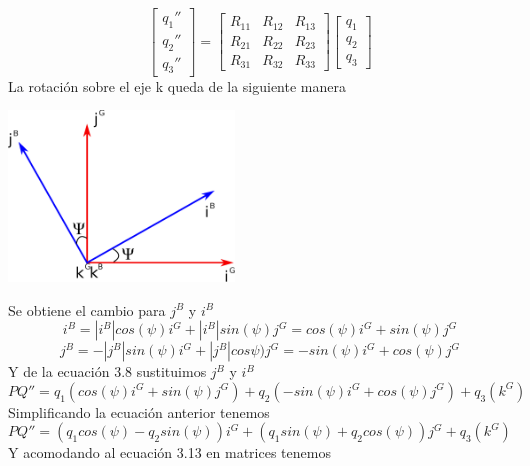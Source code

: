 \begin{equation}
	\begin{bmatrix}
		q_1'' \\
		q_2'' \\
		q_3''
	\end{bmatrix}
	=
	\begin{bmatrix}
		R_{11} & R_{12} & R_{13} \\
		R_{21} & R_{22} & R_{23} \\
		R_{31} & R_{32} & R_{33}
	\end{bmatrix}
	\begin{bmatrix}
		q_1 \\
		q_2 \\
		q_3
	\end{bmatrix}
\end{equation}
La rotación sobre el eje k queda de la siguiente manera
\begin{center}
	\includegraphics[width=0.45\textwidth]{Contenido/Cuerpo/Capitulo3/Fig15.eps}
	\label{fig:ModeloMat:Fig1}
\end{center}
Se obtiene el cambio para $j^B$ y $i^B$
\begin{equation}
	i^B = |i^B|cos(\psi)i^G + |i^B|sin(\psi)j^G = cos(\psi)i^G + sin(\psi)j^G
\end{equation}
\begin{equation}
	j^B = -|j^B|sin(\psi)i^G + |j^B|cos\psi)j^G = -sin(\psi)i^G + cos(\psi)j^G
\end{equation}
Y de la ecuación 3.8 sustituimos $j^B$ y $i^B$
\begin{equation}
	PQ'' = q_1(cos(\psi)i^G + sin(\psi)j^G) + q_2(-sin(\psi)i^G + cos(\psi)j^G) + q_3(k^G)
\end{equation}
Simplificando la ecuación anterior tenemos
\begin{equation}
	PQ''= (q_1cos(\psi) - q_2sin(\psi))i^G + (q_1sin(\psi) + q_2cos(\psi))j^G + q_3(k^G)
\end{equation}
Y acomodando al ecuación 3.13 en matrices tenemos
